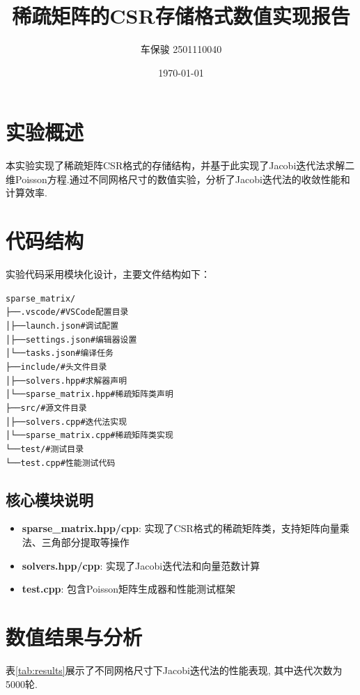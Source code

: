 \documentclass[12pt,a4paper]{article}
\title{稀疏矩阵的CSR存储格式数值实现报告}
\author{车保骏 2501110040}
\date{\today}
\begin{document}
\maketitle

\section{实验概述}
本实验实现了稀疏矩阵CSR格式的存储结构，并基于此实现了Jacobi迭代法求解二维Poisson方程.通过不同网格尺寸的数值实验，分析了Jacobi迭代法的收敛性能和计算效率.

\section{代码结构}
实验代码采用模块化设计，主要文件结构如下：

\begin{alltt}
sparse_matrix/
├── .vscode/              # VSCode配置目录
│   ├── launch.json       # 调试配置
│   ├── settings.json     # 编辑器设置
│   └── tasks.json        # 编译任务
├── include/              # 头文件目录
│   ├── solvers.hpp       # 求解器声明
│   └── sparse_matrix.hpp # 稀疏矩阵类声明
├── src/                  # 源文件目录
│   ├── solvers.cpp       # 迭代法实现
│   └── sparse_matrix.cpp # 稀疏矩阵类实现
└── test/                 # 测试目录
    └── test.cpp          # 性能测试代码
\end{alltt}

\subsection{核心模块说明}
\begin{itemize}
    \item \textbf{sparse\_matrix.hpp/cpp}: 实现了CSR格式的稀疏矩阵类，支持矩阵向量乘法、三角部分提取等操作
    \item \textbf{solvers.hpp/cpp}: 实现了Jacobi迭代法和向量范数计算
    \item \textbf{test.cpp}: 包含Poisson矩阵生成器和性能测试框架
\end{itemize}

\section{数值结果与分析}

表\ref{tab:results}展示了不同网格尺寸下Jacobi迭代法的性能表现, 其中迭代次数为5000轮.
\end{document}
